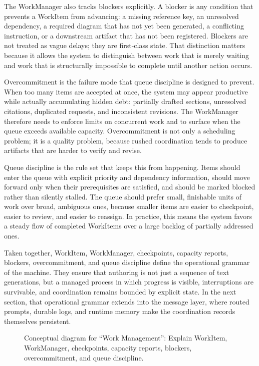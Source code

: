 The WorkManager also tracks blockers explicitly. A blocker is any condition that prevents a WorkItem from advancing: a missing reference key, an unresolved dependency, a required diagram that has not yet been generated, a conflicting instruction, or a downstream artifact that has not been registered. Blockers are not treated as vague delays; they are first-class state. That distinction matters because it allows the system to distinguish between work that is merely waiting and work that is structurally impossible to complete until another action occurs.

Overcommitment is the failure mode that queue discipline is designed to prevent. When too many items are accepted at once, the system may appear productive while actually accumulating hidden debt: partially drafted sections, unresolved citations, duplicated requests, and inconsistent revisions. The WorkManager therefore needs to enforce limits on concurrent work and to surface when the queue exceeds available capacity. Overcommitment is not only a scheduling problem; it is a quality problem, because rushed coordination tends to produce artifacts that are harder to verify and revise.

Queue discipline is the rule set that keeps this from happening. Items should enter the queue with explicit priority and dependency information, should move forward only when their prerequisites are satisfied, and should be marked blocked rather than silently stalled. The queue should prefer small, finishable units of work over broad, ambiguous ones, because smaller items are easier to checkpoint, easier to review, and easier to reassign. In practice, this means the system favors a steady flow of completed WorkItems over a large backlog of partially addressed ones.

Taken together, WorkItem, WorkManager, checkpoints, capacity reports, blockers, overcommitment, and queue discipline define the operational grammar of the machine. They ensure that authoring is not just a sequence of text generations, but a managed process in which progress is visible, interruptions are survivable, and coordination remains bounded by explicit state. In the next section, that operational grammar extends into the message layer, where routed prompts, durable logs, and runtime memory make the coordination records themselves persistent.

\begin{figure}[htbp]
\centering

\caption{Conceptual diagram for ``Work Management'': Explain WorkItem, WorkManager, checkpoints, capacity reports, blockers, overcommitment, and queue discipline.}
\end{figure}
